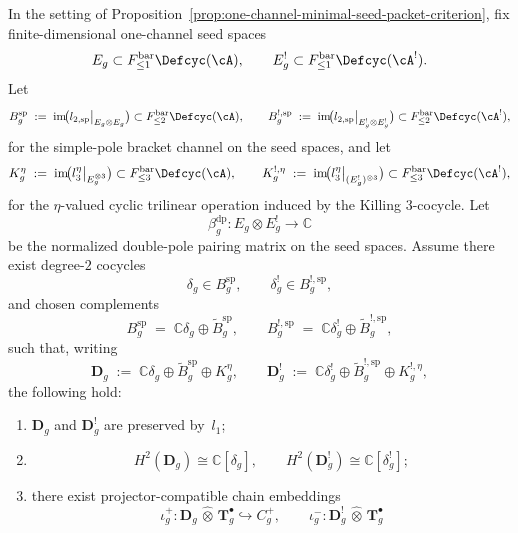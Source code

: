\begin{proposition}\label{prop:one-channel-visible-lowarity-packet-criterion}
In the setting of
Proposition~\textup{\ref{prop:one-channel-minimal-seed-packet-criterion}},
fix finite-dimensional one-channel seed spaces
\[
E_g \subset F_{\leq 1}^{\mathrm{bar}}\Defcyc(\cA),
\qquad
E_g^! \subset F_{\leq 1}^{\mathrm{bar}}\Defcyc(\cA^!).
\]
Let
\[
B_g^{\mathrm{sp}}
\;:=\;
\operatorname{im}\!\bigl(
  l_{2,\mathrm{sp}}\big|_{E_g \otimes E_g}
\bigr)
\subset F_{\leq 2}^{\mathrm{bar}}\Defcyc(\cA),
\qquad
B_g^{!,\mathrm{sp}}
\;:=\;
\operatorname{im}\!\bigl(
  l_{2,\mathrm{sp}}\big|_{E_g^! \otimes E_g^!}
\bigr)
\subset F_{\leq 2}^{\mathrm{bar}}\Defcyc(\cA^!),
\]
for the simple-pole bracket channel on the seed spaces, and let
\[
K_g^\eta
\;:=\;
\operatorname{im}\!\bigl(
  l_3^\eta\big|_{E_g^{\otimes 3}}
\bigr)
\subset F_{\leq 3}^{\mathrm{bar}}\Defcyc(\cA),
\qquad
K_g^{!,\eta}
\;:=\;
\operatorname{im}\!\bigl(
  l_3^\eta\big|_{(E_g^!)^{\otimes 3}}
\bigr)
\subset F_{\leq 3}^{\mathrm{bar}}\Defcyc(\cA^!),
\]
for the $\eta$-valued cyclic trilinear operation induced by the
Killing $3$-cocycle.  Let
\[
\beta_g^{\mathrm{dp}} \colon E_g \otimes E_g^! \longrightarrow \mathbb{C}
\]
be the normalized double-pole pairing matrix on the seed spaces.
Assume there exist degree-$2$ cocycles
\[
\delta_g \in B_g^{\mathrm{sp}},
\qquad
\delta_g^! \in B_g^{!,\mathrm{sp}},
\]
and chosen complements
\[
B_g^{\mathrm{sp}}
\;=\;
\mathbb{C}\delta_g \oplus \widetilde{B}_g^{\mathrm{sp}},
\qquad
B_g^{!,\mathrm{sp}}
\;=\;
\mathbb{C}\delta_g^! \oplus \widetilde{B}_g^{!,\mathrm{sp}},
\]
such that, writing
\[
\mathbf{D}_g
\;:=\;
\mathbb{C}\delta_g
\oplus
\widetilde{B}_g^{\mathrm{sp}}
\oplus
K_g^\eta,
\qquad
\mathbf{D}_g^!
\;:=\;
\mathbb{C}\delta_g^!
\oplus
\widetilde{B}_g^{!,\mathrm{sp}}
\oplus
K_g^{!,\eta},
\]
the following hold:
\begin{enumerate}[label=\textup{(\roman*)}]
\item $\mathbf{D}_g$ and $\mathbf{D}_g^!$ are preserved by~$l_1$;
\item
  \[
  H^2(\mathbf{D}_g)\cong \mathbb{C}[\delta_g],
  \qquad
  H^2(\mathbf{D}_g^!)\cong \mathbb{C}[\delta_g^!];
  \]
\item there exist projector-compatible chain embeddings
  \[
  \iota_g^+ \colon
  \mathbf{D}_g \,\widehat{\otimes}\, \mathbf{T}_g^\bullet
  \hookrightarrow C_g^+,
  \qquad
  \iota_g^- \colon
  \mathbf{D}_g^! \,\widehat{\otimes}\, \mathbf{T}_g^\bullet
\]
\end{enumerate}
\end{proposition}
